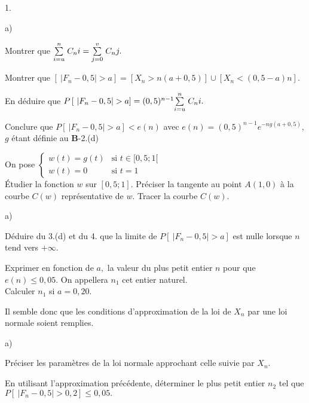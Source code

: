 \documentclass[11pt]{article}%
\begin{document}
\begin{noliste}{1.}
\begin{noliste}{a)}
 \setlength{\itemsep}{2mm}
\item Montrer que ${\textstyle\sum\limits_{i = u}^{n}}\hspace{.1cm}C_{n}{i} = {\textstyle\sum\limits_{j = 0}^{v}}\hspace{.1cm}C_{n}{j}.$

\item Montrer que $\left[ \ \left| F_{n}-0,5\right| >a\right] = \left[
X_{n}>n(a + 0,5)\right] \cup \left[ X_{n}<(0,5-a)n\right].$

\item En déduire que $P\left[ \ \left| F_{n}-0,5\right| >a\right]
 = (0,5)^{n-1}{\textstyle\sum\limits_{i = u}^{n}}\hspace{.1cm}C_{n}{i}.$

\item Conclure que $P\left[ \ \left| F_{n}-0,5\right| >a\right] <e(n)$
avec $e(n) = (0,5)^{n-1}e^{-ng(a + 0,5)},$ $g$ étant définie au
\textbf{B}-2.(d)
\end{noliste}

\item On pose $\left\{ 
\begin{array}{cc}
w(t) = g(t) & \text{si }t\in \lbrack 0,5;1[ \ \\
w(t) = 0 & \text{si }t = 1
\end{array}
\right. $\\
Étudier la fonction $w$ sur $[0,5;1].$ Préciser la tangente au point
$A(1,0)$
à la courbe $C(w)$ représentative de $w.$ Tracer la courbe $C(w).$

\item 

\begin{noliste}{a)}
 \setlength{\itemsep}{2mm}
\item Déduire du 3.(d) et du 4. que la limite de $P\left[ \ \left|
F_{n}-0,5\right| >a\right] $ est nulle lorsque $n$ tend vers $ +
\infty.$

\item Exprimer en fonction de $a,$ la valeur du plus petit entier $n$
pour
que $e(n)\leq 0,05.$ On appellera $n_{1}$ cet entier naturel.\\
Calculer $n_{1}$ si $a = 0,20.$
\end{noliste}

\item Il semble donc que les conditions d'approximation de la loi de
$X_{n}$
par une loi normale soient remplies.

\begin{noliste}{a)}
 \setlength{\itemsep}{2mm}
\item Préciser les paramètres de la loi normale approchant celle suivie
par $X_{n}.$

\item En utilisant l'approximation précédente, déterminer le plus petit
entier $n_{2}$ tel que $P\left[ \ \left| F_{n}-0,5\right| >0,2\right]
\leq 0,05.$
\end{noliste}
\end{noliste}

\label{fin}
\end{document}
